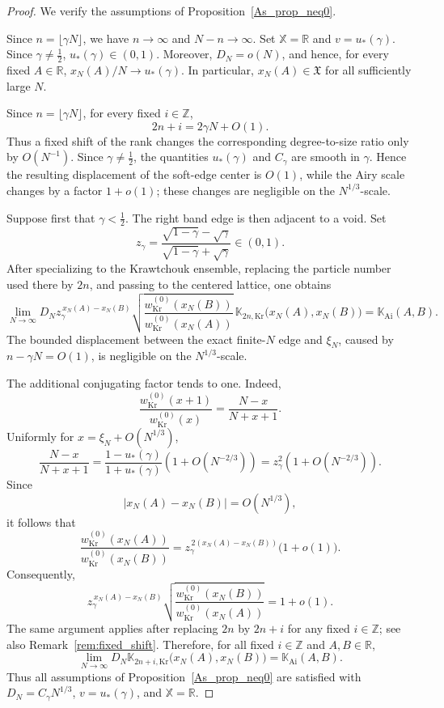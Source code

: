\documentclass[reqno,11pt]{amsart}
\newcommand{\ZZ}{\mathbb{Z}}
\newcommand{\RR}{\mathbb{R}}
\theoremstyle{plain}
\theoremstyle{definition}
\numberwithin{equation}{section}
\begin{document}
\begin{proof}
We verify the assumptions of
Proposition~\ref{As_prop_neq0}.

Since $n=\lfloor\gamma N\rfloor$, we have $n\to\infty$ and $N-n\to\infty$. Set $\mathbb X=\RR$ and
$v=u_\ast(\gamma)$. Since $\gamma\neq\frac12$,
$u_\ast(\gamma)\in(0,1)$. Moreover, $D_N=o(N)$, and hence, for every fixed $A\in\RR$, $x_N(A)/N\to u_\ast(\gamma)$. In particular, $x_N(A)\in\mathfrak X$ for all sufficiently large $N$.

Since \(n=\lfloor\gamma N\rfloor\), for every fixed \(i\in\ZZ\),
\[
2n+i=2\gamma N+O(1).
\]
Thus a fixed shift of the rank changes the corresponding degree-to-size ratio only by $O(N^{-1})$. Since $\gamma\neq\frac12$,
the quantities $u_\ast(\gamma)$ and $C_\gamma$ are smooth in $\gamma$. Hence the resulting displacement of the soft-edge center is $O(1)$, while the Airy scale changes by a factor $1+o(1)$; these changes are negligible on the $N^{1/3}$-scale.

Suppose first that \(\gamma<\frac12\). The right band edge is then
adjacent to a void.  Set
\[
z_\gamma
=
\frac{\sqrt{1-\gamma}-\sqrt{\gamma}}
     {\sqrt{1-\gamma}+\sqrt{\gamma}}
\in(0,1).
\]
After specializing \cite[Theorem~1.5 and
formulas~(5.11), (5.13)]{betea2024} to the Krawtchouk ensemble,
replacing the particle number used there by \(2n\), and passing to
the centered lattice, one obtains
\[
\lim_{N\to\infty}
D_N
z_\gamma^{\,x_N(A)-x_N(B)}
\sqrt{
\frac{
w_{\mathrm{Kr}}^{(0)}(x_N(B))
}{
w_{\mathrm{Kr}}^{(0)}(x_N(A))
}
}
\,
\mathbb K_{2n,\mathrm{Kr}}
\bigl(x_N(A),x_N(B)\bigr)
=
\mathbb K_{\mathrm{Ai}}(A,B).
\]
The bounded displacement between the exact finite-\(N\) edge and
\(\xi_N\), caused by \(n-\gamma N=O(1)\), is negligible on the
\(N^{1/3}\)-scale.

The additional conjugating factor tends to one. Indeed,
\[
\frac{w_{\mathrm{Kr}}^{(0)}(x+1)}
     {w_{\mathrm{Kr}}^{(0)}(x)}
=
\frac{N-x}{N+x+1}.
\]
Uniformly for \(x=\xi_N+O(N^{1/3})\),
\[
\frac{N-x}{N+x+1}
=
\frac{1-u_\ast(\gamma)}
     {1+u_\ast(\gamma)}
\left(1+O(N^{-2/3})\right)
=
z_\gamma^2
\left(1+O(N^{-2/3})\right).
\]
Since
\[
|x_N(A)-x_N(B)|=O(N^{1/3}),
\]
it follows that
\[
\frac{
w_{\mathrm{Kr}}^{(0)}(x_N(A))
}{
w_{\mathrm{Kr}}^{(0)}(x_N(B))
}
=
z_\gamma^{\,2(x_N(A)-x_N(B))}
\bigl(1+o(1)\bigr).
\]
Consequently,
\[
z_\gamma^{\,x_N(A)-x_N(B)}
\sqrt{
\frac{
w_{\mathrm{Kr}}^{(0)}(x_N(B))
}{
w_{\mathrm{Kr}}^{(0)}(x_N(A))
}
}
=
1+o(1).
\]
The same argument applies after replacing $2n$ by $2n+i$ for any
fixed $i\in\ZZ$; see also Remark~\ref{rem:fixed_shift}. Therefore,
for all fixed $i\in\ZZ$ and $A,B\in\RR$,
\[
\lim_{N\to\infty}
D_N
\mathbb K_{2n+i,\mathrm{Kr}}
\bigl(x_N(A),x_N(B)\bigr)
=
\mathbb K_{\mathrm{Ai}}(A,B).
\]
Thus all assumptions of Proposition~\ref{As_prop_neq0} are satisfied
with $D_N=C_\gamma N^{1/3}$, $v=u_\ast(\gamma)$, and
$\mathbb X=\RR$.


\end{proof}
\end{document}
